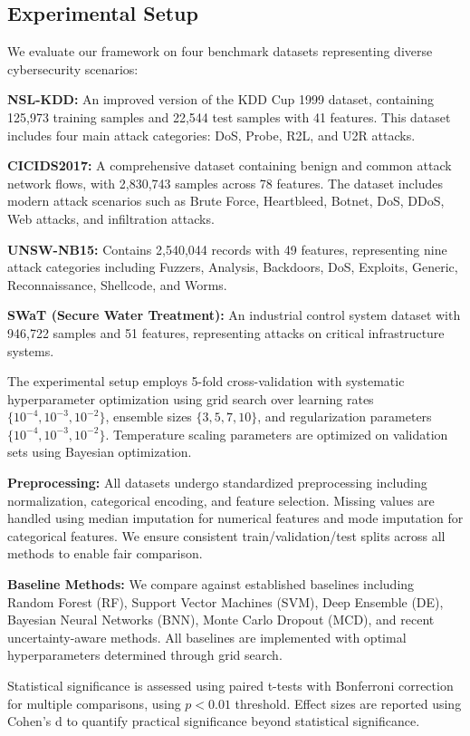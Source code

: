 \documentclass[journal]{IEEEtran}
\begin{document}
\subsection{Experimental Setup}

We evaluate our framework on four benchmark datasets representing diverse cybersecurity scenarios:

\textbf{NSL-KDD:} An improved version of the KDD Cup 1999 dataset, containing 125,973 training samples and 22,544 test samples with 41 features. This dataset includes four main attack categories: DoS, Probe, R2L, and U2R attacks.

\textbf{CICIDS2017:} A comprehensive dataset containing benign and common attack network flows, with 2,830,743 samples across 78 features. The dataset includes modern attack scenarios such as Brute Force, Heartbleed, Botnet, DoS, DDoS, Web attacks, and infiltration attacks.

\textbf{UNSW-NB15:} Contains 2,540,044 records with 49 features, representing nine attack categories including Fuzzers, Analysis, Backdoors, DoS, Exploits, Generic, Reconnaissance, Shellcode, and Worms.

\textbf{SWaT (Secure Water Treatment):} An industrial control system dataset with 946,722 samples and 51 features, representing attacks on critical infrastructure systems.

The experimental setup employs 5-fold cross-validation with systematic hyperparameter optimization using grid search over learning rates $\{10^{-4}, 10^{-3}, 10^{-2}\}$, ensemble sizes $\{3, 5, 7, 10\}$, and regularization parameters $\{10^{-4}, 10^{-3}, 10^{-2}\}$. Temperature scaling parameters are optimized on validation sets using Bayesian optimization.

\textbf{Preprocessing:} All datasets undergo standardized preprocessing including normalization, categorical encoding, and feature selection. Missing values are handled using median imputation for numerical features and mode imputation for categorical features. We ensure consistent train/validation/test splits across all methods to enable fair comparison.

\textbf{Baseline Methods:} We compare against established baselines including Random Forest (RF), Support Vector Machines (SVM), Deep Ensemble (DE), Bayesian Neural Networks (BNN), Monte Carlo Dropout (MCD), and recent uncertainty-aware methods. All baselines are implemented with optimal hyperparameters determined through grid search.

Statistical significance is assessed using paired t-tests with Bonferroni correction for multiple comparisons, using $p < 0.01$ threshold. Effect sizes are reported using Cohen's d to quantify practical significance beyond statistical significance.
\end{document}
